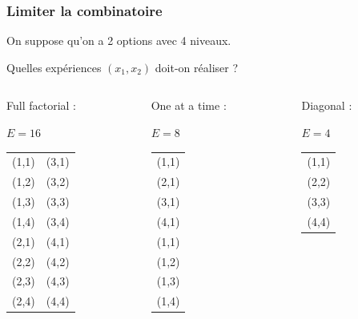 \documentclass{beamer}
\begin{document}
\begin{frame}[containsverbatim]
\frametitle{Limiter la combinatoire}

\begin{example}
On suppose qu'on a 2 options avec 4 niveaux. 

Quelles expériences $(x_1,x_2)$ doit-on réaliser ?
\begin{columns}[t]

    \begin{column}[t]{0.25\textwidth}
Full factorial : 

$E=16$

\begin{tabular}{l|l}
(1,1)&(3,1)\\
(1,2)&(3,2)\\
(1,3)&(3,3)\\
(1,4)&(3,4)\\
\hline
(2,1)&(4,1)\\
(2,2)&(4,2)\\
(2,3)&(4,3)\\
(2,4)&(4,4)\\
\end{tabular}

    \end{column}
	
    \begin{column}[t]{0.25\textwidth}
One at a time : 

$E=8$

\begin{tabular}{l}
(1,1)\\
(2,1)\\
(3,1)\\
(4,1)\\
\hline
(1,1)\\
(1,2)\\
(1,3)\\
(1,4)\\
\end{tabular}

    \end{column}
    \begin{column}[t]{0.25\textwidth}
Diagonal : 

$E=4$

\begin{tabular}{l}
(1,1)\\
(2,2)\\
(3,3)\\
(4,4)\\
\end{tabular}

    \end{column}
\end{columns}

\end{example}

\end{frame}
\end{document}
